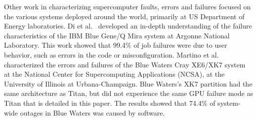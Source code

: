 Other work in characterizing supercomputer faults, errors and failures focused on the various systems deployed around the world, primarily at US Department of Energy laboratories.
%
Di et al.~\cite{8809553} developed an in-depth understanding of the failure characteristics of the IBM Blue Gene/Q Mira system at Argonne National Laboratory. This work showed that 99.4\% of job failures were due to user behavior, such as errors in the code or misconfiguration. Martino et al.~\cite{6903615} characterized the errors and failures of the Blue Waters Cray XE6/XK7 system at the National Center for Supercomputing Applications (NCSA), at the University of Illinois at Urbana-Champaign. Blue Waters's XK7 partition had the same architecture as Titan, but did not experience the same GPU failure mode as Titan that is detailed in this paper. The results showed that 74.4\% of system-wide outages in Blue Waters was caused by software.



